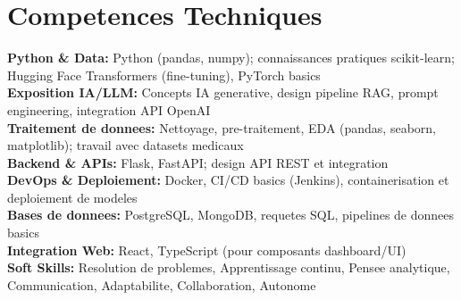 \documentclass[10pt,a4paper]{article}
\begin{document}
\section*{Competences Techniques}
{\small
\textbf{Python \& Data:} Python (pandas, numpy); connaissances pratiques scikit-learn; Hugging Face Transformers (fine-tuning), PyTorch basics\\[2pt]
\textbf{Exposition IA/LLM:} Concepts IA generative, design pipeline RAG, prompt engineering, integration API OpenAI\\[2pt]
\textbf{Traitement de donnees:} Nettoyage, pre-traitement, EDA (pandas, seaborn, matplotlib); travail avec datasets medicaux\\[2pt]
\textbf{Backend \& APIs:} Flask, FastAPI; design API REST et integration\\[2pt]
\textbf{DevOps \& Deploiement:} Docker, CI/CD basics (Jenkins), containerisation et deploiement de modeles\\[2pt]
\textbf{Bases de donnees:} PostgreSQL, MongoDB, requetes SQL, pipelines de donnees basics\\[2pt]
\textbf{Integration Web:} React, TypeScript (pour composants dashboard/UI)\\[2pt]
\textbf{Soft Skills:} Resolution de problemes, Apprentissage continu, Pensee analytique, Communication, Adaptabilite, Collaboration, Autonome
}

\vspace{6pt}

\end{document}
